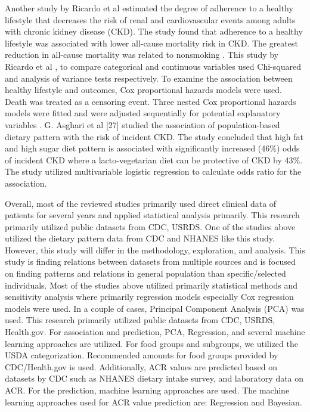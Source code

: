 \noindent Another study by Ricardo et al \cite{Ricardoetal2015} estimated the degree of adherence to a healthy lifestyle that decreases the risk of renal and cardiovascular events among adults with chronic kidney disease (CKD). The study found that adherence to a healthy lifestyle was associated with lower all-cause mortality risk in CKD. The greatest reduction in all-cause mortality was related to nonsmoking \cite{Ricardoetal2015}. This study by Ricardo et al \cite{Ricardoetal2015}, to compare categorical and continuous variables used Chi-squared and analysis of variance tests respectively. To examine the association between healthy lifestyle and outcomes, Cox proportional hazards models were used. Death was treated as a censoring event. Three nested Cox proportional hazards models were fitted and were adjusted sequentially for potential explanatory variables \cite{Ricardoetal2015}. G. Asghari et al [27] studied the association of population-based dietary pattern with the risk of incident CKD. The study concluded that high fat and high sugar diet pattern is associated with significantly increased (46\%) odds of incident CKD where a lacto-vegetarian diet can be protective of CKD by 43\%. The study utilized multivariable logistic regression to calculate odds ratio for the association.

\noindent  Overall, most of the reviewed studies primarily used direct clinical data of patients for several years and applied statistical analysis primarily. This research primarily utilized public datasets from CDC, USRDS.  One of the studies above utilized the dietary pattern data from CDC and NHANES like this study. However, this study will differ in the methodology, exploration, and analysis. This study is finding relations between datasets from multiple sources and is focused on finding patterns and relations in general population than specific/selected individuals. Most of the studies above utilized primarily statistical methods and sensitivity analysis where primarily regression models especially Cox regression models were used. In a couple of cases, Principal Component Analysis (PCA) was used. This research primarily utilized public datasets from CDC, USRDS, Health.gov. For association and prediction, PCA, Regression, and several machine learning approaches are utilized. For food groups and subgroups,  we utilized the USDA categorization. Recommended amounts for food groups provided by CDC/Health.gov is used. Additionally, ACR values are predicted based on datasets by CDC such as NHANES dietary intake survey, and laboratory data on ACR. For the prediction, machine learning approaches are used.  The machine learning approaches used for ACR value prediction are: Regression and Bayesian.